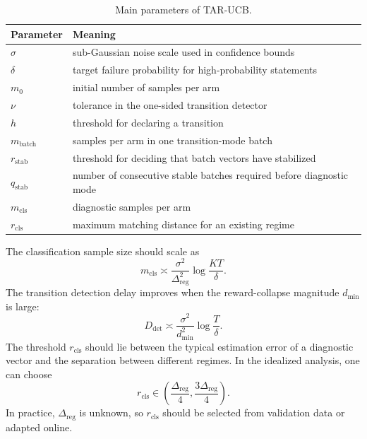 \documentclass[11pt]{article}
\begin{document}
\begin{table}[h]
\centering
\begin{tabular}{ll}
\toprule
Parameter & Meaning \\
\midrule
$\sigma$ & sub-Gaussian noise scale used in confidence bounds \\
$\delta$ & target failure probability for high-probability statements \\
$m_0$ & initial number of samples per arm \\
$\nu$ & tolerance in the one-sided transition detector \\
$h$ & threshold for declaring a transition \\
$m_{\mathrm{batch}}$ & samples per arm in one transition-mode batch \\
$r_{\mathrm{stab}}$ & threshold for deciding that batch vectors have stabilized \\
$q_{\mathrm{stab}}$ & number of consecutive stable batches required before diagnostic mode \\
$m_{\mathrm{cls}}$ & diagnostic samples per arm \\
$r_{\mathrm{cls}}$ & maximum matching distance for an existing regime \\
\bottomrule
\end{tabular}
\caption{Main parameters of TAR-UCB.}
\label{tab:tar_parameters}
\end{table}

The classification sample size should scale as
\begin{equation}
\label{eq:practical_m_cls_choice}
m_{\mathrm{cls}}
\asymp
\frac{\sigma^2}{\Delta_{\mathrm{reg}}^2}
\log\frac{KT}{\delta}.
\end{equation}
The transition detection delay improves when the reward-collapse magnitude $d_{\min}$ is large:
\begin{equation}
\label{eq:practical_detection_scaling}
D_{\mathrm{det}}
\asymp
\frac{\sigma^2}{d_{\min}^2}
\log\frac{T}{\delta}.
\end{equation}
The threshold $r_{\mathrm{cls}}$ should lie between the typical estimation error of a diagnostic vector and the separation between different regimes. In the idealized analysis, one can choose
\begin{equation}
\label{eq:practical_r_cls_choice}
r_{\mathrm{cls}}\in
\left(
\frac{\Delta_{\mathrm{reg}}}{4},
\frac{3\Delta_{\mathrm{reg}}}{4}
\right).
\end{equation}
In practice, $\Delta_{\mathrm{reg}}$ is unknown, so $r_{\mathrm{cls}}$ should be selected from validation data or adapted online.
\end{document}
